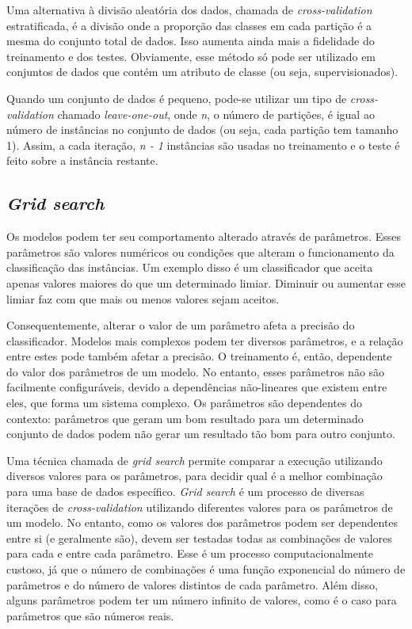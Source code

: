 Uma alternativa à divisão aleatória dos dados, chamada de \emph{cross-validation} estratificada, é a divisão onde a proporção das classes em cada partição é a mesma do conjunto total de dados. Isso aumenta ainda mais a fidelidade do treinamento e dos testes. Obviamente, esse método só pode ser utilizado em conjuntos de dados que contém um atributo de classe (ou seja, supervisionados).

Quando um conjunto de dados é pequeno, pode-se utilizar um tipo de \emph{cross-validation} chamado \emph{leave-one-out}, onde \emph{n}, o número de partições, é igual ao número de instâncias no conjunto de dados (ou seja, cada partição tem tamanho 1). Assim, a cada iteração, \emph{n - 1} instâncias são usadas no treinamento e o teste é feito sobre a instância restante.

\subsection{\emph{Grid search}}

Os modelos podem ter seu comportamento alterado através de parâmetros. Esses parâmetros são valores numéricos ou condições que alteram o funcionamento da classificação das instâncias. Um exemplo disso é um classificador que aceita apenas valores maiores do que um determinado limiar. Diminuir ou aumentar esse limiar faz com que mais ou menos valores sejam aceitos.

Consequentemente, alterar o valor de um parâmetro afeta a precisão do classificador. Modelos mais complexos podem ter diversos parâmetros, e a relação entre estes pode também afetar a precisão. O treinamento é, então, dependente do valor dos parâmetros de um modelo. No entanto, esses parâmetros não são facilmente configuráveis, devido a dependências não-lineares que existem entre eles, que forma um sistema complexo. Os parâmetros são dependentes do contexto: parâmetros que geram um bom resultado para um determinado conjunto de dados podem não gerar um resultado tão bom para outro conjunto.

Uma técnica chamada de \emph{grid search} permite comparar a execução utilizando diversos valores para os parâmetros, para decidir qual é a melhor combinação para uma base de dados específico. \emph{Grid search} é um processo de diversas iterações de \emph{cross-validation} utilizando diferentes valores para os parâmetros de um modelo. No entanto, como os valores dos parâmetros podem ser dependentes entre si (e geralmente são), devem ser testadas todas as combinações de valores para cada e entre cada parâmetro. Esse é um processo computacionalmente custoso, já que o número de combinações é uma função exponencial do número de parâmetros e do número de valores distintos de cada parâmetro. Além disso, alguns parâmetros podem ter um número infinito de valores, como é o caso para parâmetros que são números reais.


